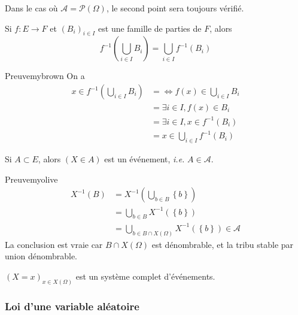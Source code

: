     Dans le cas où $\mathcal{A} = \mathcal{P}(\Omega)$, le second point sera toujours vérifié. 

    \begin{lem}{}{}
        Si $f : E \to F$ et $(B_i)_{i \in I}$ est une famille de parties de $F$, alors 
        \[ f^{-1} \left(\bigcup_{i \in I} B_i\right) = \bigcup_{i \in I} f^{-1}(B_i) \]   
    \end{lem}

    \begin{demo}{Preuve}{mybrown}
        On a 
        \begin{align*}
            x \in f^{-1}\left(\bigcup_{i \in I} B_i\right) 
            &= \iff f(x) \in \bigcup_{i \in I} B_i \\
            &= \exists i \in I, f(x) \in B_i \\
            &= \exists i \in I, x \in f^{-1}(B_i) \\
            &= x \in \bigcup_{i \in I} f^{-1}(B_i)
        \end{align*}
    \end{demo}

    \begin{prop}{}{}
        Si $A \subset E$, alors $(X \in A)$ est un événement, \textit{i.e.} $A \in \mathcal{A}$.
    \end{prop}

    \begin{demo}{Preuve}{myolive}
        \begin{align*}
            X^{-1}(B) &= X^{-1}\left(\bigcup_{b \in B} \left\{b\right\}\right) \\
            &= \bigcup_{b \in B} X^{-1}(\left\{b\right\}) \\
            &= \bigcup_{b \in B \cap X(\Omega)} X^{-1}(\left\{b\right\}) \in \mathcal{A}
        \end{align*}
        La conclusion est vraie car $B \cap X(\Omega)$ est dénombrable, et la tribu stable par union dénombrable.
    \end{demo}

    \begin{theo}{}{}
        $(X = x)_{x \in X(\Omega)}$ est un système complet d’événements.
    \end{theo}

    \subsubsection{Loi d’une variable aléatoire}

